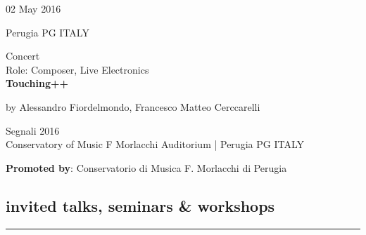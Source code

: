 \documentclass[7pt,a4paper]{article}
\begin{document}
\begin{mdframed}[
    backgroundcolor=entrygray,
    linecolor=entrygray,
    linewidth=0pt,
    innerleftmargin=6pt,
    innerrightmargin=6pt,
    innertopmargin=6pt,
    innerbottommargin=6pt,
    skipabove=0pt,
    skipbelow=0pt
]

\begin{minipage}[t]{0.28\textwidth}

02 May 2016

\scriptsize Perugia PG ITALY


\end{minipage}
\begin{minipage}[t]{0.68\textwidth}
\small Concert
\\\scriptsize Role: Composer, Live Electronics
\\ \normalsize \textbf{Touching++}
\par\scriptsize by Alessandro Fiordelmondo, Francesco Matteo Cerccarelli

\vspace{0.25cm}



\small Segnali 2016\\Conservatory of Music F Morlacchi Auditorium | \scriptsize Perugia PG ITALY

\vspace{0.1cm}
\scriptsize

\vspace{0.1cm}
\par \textbf{Promoted by}: Conservatorio di Musica F. Morlacchi di Perugia
\end{minipage}
\vspace{0.25cm}
\end{mdframed}



\subsection*{invited talks, seminars \& workshops}
\normalsize
\vspace{-0.5cm}
\rule{\textwidth}{0.4pt}
\vspace{0.1cm}
\end{document}
